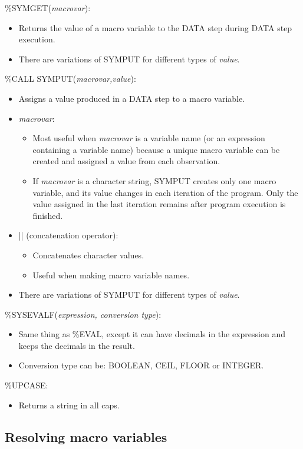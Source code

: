 \documentclass[11pt, oneside]{article}
\begin{document}
\%SYMGET(\textit{macrovar}):
\begin{itemize}
\item Returns the value of a macro variable to the DATA step during DATA step execution.
\item There are variations of SYMPUT for different types of \textit{value}.
\end{itemize}

\%CALL SYMPUT(\textit{macrovar,value}):
\begin{itemize}
\item Assigns a value produced in a DATA step to a macro variable. 
\item \textit{macrovar}:
	\begin{itemize}
	\item Most useful when \textit{macrovar} is a variable name (or an expression containing a variable name) because a unique macro variable can be created and assigned a value from each observation.
	\item If \textit{macrovar} is a character string, SYMPUT creates only one macro variable, and its value changes in each iteration of the program. Only the value assigned in the last iteration remains after program execution is finished.
	\end{itemize}
\item || (concatenation operator):
	\begin{itemize}
	\item Concatenates character values.
	\item Useful when making macro variable names.
	\end{itemize}
\item There are variations of SYMPUT for different types of \textit{value}.
\end{itemize}

\%SYSEVALF(\textit{expression, conversion type}):
\begin{itemize}
\item Same thing as \%EVAL, except it can have decimals in the expression and keeps the decimals in the result.
\item Conversion type can be: BOOLEAN, CEIL, FLOOR or INTEGER.
\end{itemize}

\%UPCASE:
\begin{itemize}
\item Returns a string in all caps.
\end{itemize}
	
\subsection{Resolving macro variables}
\end{document}
